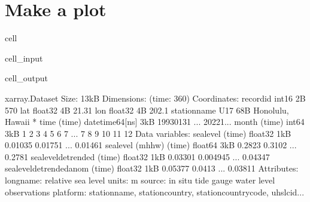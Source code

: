 \documentclass[letterpaper,10pt,english]{jupyterBook}
\begin{document}
\chapter{Make a plot}
\label{\detokenize{notebooks/regional_and_local/SL_anomaly_intra-annual:make-a-plot}}
\begin{sphinxuseclass}{cell}\begin{sphinxVerbatimInput}

\begin{sphinxuseclass}{cell_input}
\begin{sphinxVerbatim}[commandchars=\\\{\}]
\end{sphinxVerbatim}

\end{sphinxuseclass}\end{sphinxVerbatimInput}
\begin{sphinxVerbatimOutput}

\begin{sphinxuseclass}{cell_output}
\begin{sphinxVerbatim}[commandchars=\\\{\}]
\PYGZlt{}xarray.Dataset\PYGZgt{} Size: 13kB
Dimensions:                   (time: 360)
Coordinates:
    record\PYGZus{}id                 int16 2B 570
    lat                       float32 4B 21.31
    lon                       float32 4B 202.1
    station\PYGZus{}name              \PYGZlt{}U17 68B \PYGZsq{}Honolulu, Hawaii\PYGZsq{}
  * time                      (time) datetime64[ns] 3kB 1993\PYGZhy{}01\PYGZhy{}31 ... 2022\PYGZhy{}1...
    month                     (time) int64 3kB 1 2 3 4 5 6 7 ... 7 8 9 10 11 12
Data variables:
    sea\PYGZus{}level                 (time) float32 1kB 0.01035 \PYGZhy{}0.01751 ... 0.01461
    sea\PYGZus{}level (mhhw)          (time) float64 3kB \PYGZhy{}0.2823 \PYGZhy{}0.3102 ... \PYGZhy{}0.2781
    sea\PYGZus{}level\PYGZus{}detrended       (time) float32 1kB 0.03301 0.004945 ... \PYGZhy{}0.04347
    sea\PYGZus{}level\PYGZus{}detrended\PYGZus{}anom  (time) float32 1kB 0.05377 0.0413 ... \PYGZhy{}0.03811
Attributes:
    long\PYGZus{}name:  relative sea level
    units:      m
    source:     in situ tide gauge water level observations
    platform:   station\PYGZus{}name, station\PYGZus{}country, station\PYGZus{}country\PYGZus{}code, uhslc\PYGZus{}id...
\end{sphinxVerbatim}

\end{sphinxuseclass}\end{sphinxVerbatimOutput}

\end{sphinxuseclass}
\end{document}
